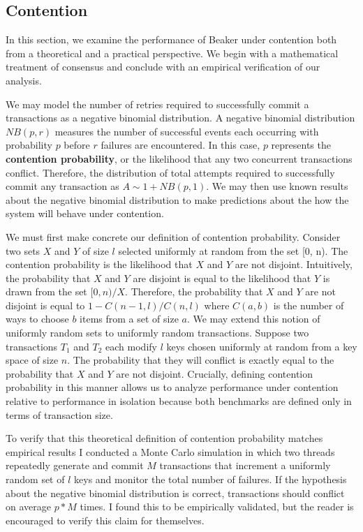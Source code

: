 \documentclass[../main.tex]{subfiles}
\begin{document}
  \subsection{Contention}
  In this section, we examine the performance of Beaker under contention both from a theoretical
  and a practical perspective. We begin with a mathematical treatment of consensus and conclude with
  an empirical verification of our analysis.

  We may model the number of retries required to successfully commit a transactions as a negative
  binomial distribution. A negative binomial distribution $NB(p, r)$ measures the number of
  successful events each occurring with probability $p$ before $r$ failures are encountered. In
  this case, $p$ represents the \textbf{contention probability}, or the likelihood that any two
  concurrent transactions conflict. Therefore, the distribution of total attempts required to
  successfully commit any transaction as $A \sim 1 + NB(p, 1)$. We may then use known results about
  the negative binomial distribution to make predictions about the how the system will behave under
  contention.

  We must first make concrete our definition of contention probability. Consider two sets $X$ and
  $Y$ of size $l$ selected uniformly at random from the set [0, n). The contention probability is
  the likelihood that $X$ and $Y$ are not disjoint. Intuitively, the probability that $X$ and $Y$
  are disjoint is equal to the likelihood that $Y$ is drawn from the set $[0, n) / X$. Therefore,
  the probability that $X$ and $Y$ are not disjoint is equal to $1 - C(n - 1, l) / C(n, l)$ where
  $C(a, b)$ is the number of ways to choose $b$ items from a set of size $a$. We may extend this
  notion of uniformly random sets to uniformly random transactions. Suppose two transactions $T_1$
  and $T_2$ each modify $l$ keys chosen uniformly at random from a key space of size $n$. The
  probability that they will conflict is exactly equal to the probability that $X$ and $Y$ are not
  disjoint. Crucially, defining contention probability in this manner allows us to analyze
  performance under contention relative to performance in isolation because both benchmarks are
  defined only in terms of transaction size.

  To verify that this theoretical definition of contention probability matches empirical results I
  conducted a Monte Carlo simulation in which two threads repeatedly generate and commit $M$
  transactions that increment a uniformly random set of $l$ keys and monitor the total number of
  failures. If the hypothesis about the negative binomial distribution is correct, transactions
  should conflict on average $p * M$ times. I found this to be empirically validated, but the reader
  is encouraged to verify this claim for themselves.
\end{document}
